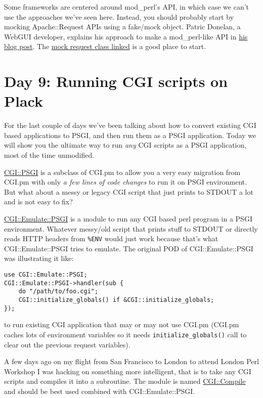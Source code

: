 Some frameworks are centered around mod\_perl's API, in which case we
can't use the approaches we've seen here. Instead, you should probably
start by mocking Apache::Request APIs using a fake/mock object. Patric
Donelan, a WebGUI developer, explains his approach to make a
mod\_perl-like API in
\href{http://blog.patspam.com/2009/plack-roundup-at-sf-pm}{his blog
post}. The
\href{http://github.com/pdonelan/webgui/blob/plebgui/lib/WebGUI/Session/Plack.pm}{mock
request class linked} is a good place to start.

\chapter{Day 9: Running CGI scripts on
Plack}\label{day-9-running-cgi-scripts-on-plack}

For the last couple of days we've been talking about how to convert
existing CGI based applications to PSGI, and then run them as a PSGI
application. Today we will show you the ultimate way to run \emph{any}
CGI scripts as a PSGI application, most of the time unmodified.

\href{http://search.cpan.org/perldoc?CGI::PSGI}{CGI::PSGI} is a subclass
of CGI.pm to allow you a very easy migration from CGI.pm with only
\emph{a few lines of code changes} to run it on PSGI environment. But
what about a messy or legacy CGI script that just prints to STDOUT a lot
and is not easy to fix?

\href{http://search.cpan.org/perldoc?CGI::Emulate::PSGI}{CGI::Emulate::PSGI}
is a module to run any CGI based perl program in a PSGI environment.
Whatever messy/old script that prints stuff to STDOUT or directly reads
HTTP headers from \lstinline!%ENV! would just work because that's what
CGI::Emulate::PSGI tries to emulate. The original POD of
CGI::Emulate::PSGI was illustrating it like:

\begin{lstlisting}
use CGI::Emulate::PSGI;
CGI::Emulate::PSGI->handler(sub {
    do "/path/to/foo.cgi";
    CGI::initialize_globals() if &CGI::initialize_globals;
});
\end{lstlisting}

to run existing CGI application that may or may not use CGI.pm (CGI.pm
caches lots of environment variables so it needs
\lstinline!initialize_globals()! call to clear out the previous request
variables).

A few days ago on my flight from San Francisco to London to attend
London Perl Workshop I was hacking on something more intelligent, that
is to take any CGI scripts and compiles it into a subroutine. The module
is named
\href{http://search.cpan.org/perldoc?CGI::Compile}{CGI::Compile} and
should be best used combined with CGI::Emulate::PSGI.

